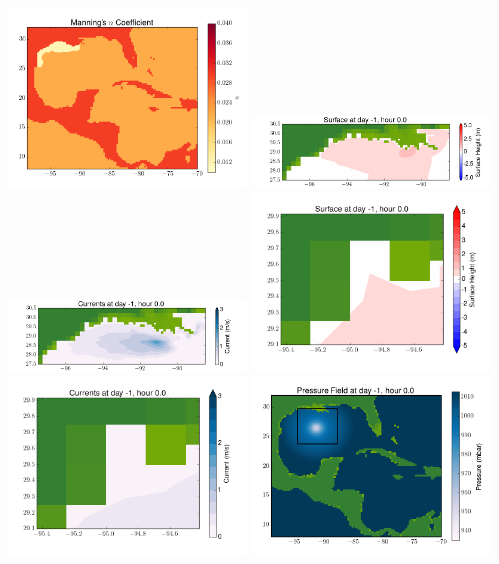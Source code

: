 \documentclass[11pt]{article}
\begin{document}
\vskip 10pt 
\includegraphics[width=0.475\textwidth]{frame0048fig3.png}
\includegraphics[width=0.475\textwidth]{frame0048fig4.png}
\vskip 10pt 
\includegraphics[width=0.475\textwidth]{frame0048fig5.png}
\includegraphics[width=0.475\textwidth]{frame0048fig6.png}
\vskip 10pt 
\includegraphics[width=0.475\textwidth]{frame0048fig7.png}
\includegraphics[width=0.475\textwidth]{frame0048fig8.png}
\end{document}
